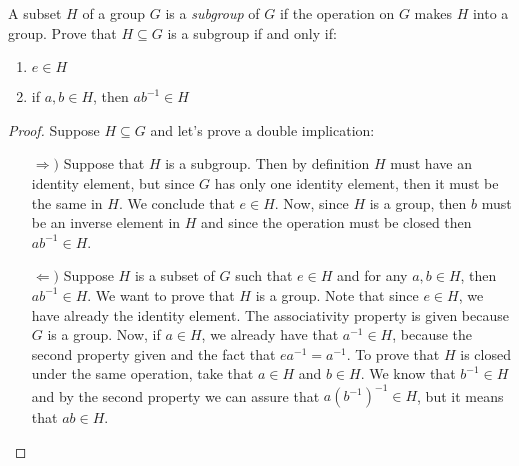 \documentclass{tufte-handout}
\begin{document}
\begin{problem}
A subset $H$ of a group $G$ is a \textit{subgroup} of $G$ if the operation on $G$ makes $H$ into a group. Prove that $H \subseteq G$ is a subgroup if and only if:
\begin{enumerate}
	\item $e \in H$
	\item if $a, b \in H$, then $ab^{-1} \in H$
\end{enumerate}
\end{problem}
\begin{proof}
	Suppose $H \subseteq G$ and let's prove a double implication:
	\begin{itemize}
		\item[$\Rightarrow)$] Suppose that $H$ is a subgroup. Then by definition $H$ must have an identity element, but since $G$ has only one identity element, then it must be the same in $H$. We conclude that $e \in H$. Now, since $H$ is a group, then $b$ must be an inverse element in $H$ and since the operation must be closed then $ab^{-1} \in H$.
		\item[$\Leftarrow)$] Suppose $H$ is a subset of $G$ such that $e \in H$ and for any $a, b \in H$, then $ab^{-1} \in H$. We want to prove that $H$ is a group. Note that since $e \in H$, we have already the identity element. The associativity property is given because $G$ is a group. Now, if $a \in H$, we already have that $a^{-1} \in H$, because the second property given and the fact that $ea^{-1} = a^{-1}$. To prove that $H$ is closed under the same operation, take that $a \in H$ and $b \in H$. We know that $b^{-1} \in H$ and by the second property we can assure that $a(b^{-1})^{-1} \in H$, but it means that $ab \in H$. 
	\end{itemize}
\end{proof}
\end{document}
